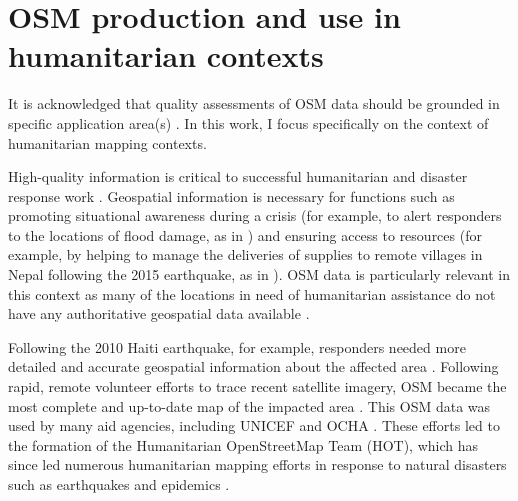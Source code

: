\section{OSM production and use in humanitarian contexts}

It is acknowledged that quality assessments of OSM data should be grounded in specific application area(s) \parencite{barron_comprehensive_2014}. In this work, I focus specifically on the context of humanitarian mapping contexts.

High-quality information is critical to successful humanitarian and disaster response work \parencite{cowan_geospatial_2011, poser_volunteered_2010, soden_infrastructure_2016, zook_volunteered_2010}. Geospatial information is necessary for functions such as promoting situational awareness during a crisis (for example, to alert responders to the locations of flood damage, as in \textcite{poser_volunteered_2010}) and ensuring access to resources (for example, by helping to manage the deliveries of supplies to remote villages in Nepal following the 2015 earthquake, as in \textcite{soden_infrastructure_2016}). OSM data is particularly relevant in this context as many of the locations in need of humanitarian assistance do not have any authoritative geospatial data available \parencite{zook_volunteered_2010}. 

Following the 2010 Haiti earthquake, for example, responders needed more detailed and accurate geospatial information about the affected area  \parencite{meier_crisis_2012, soden_infrastructure_2016, zook_volunteered_2010}. Following rapid, remote volunteer efforts to trace recent satellite imagery, OSM became the most complete and up-to-date map of the impacted area \parencite{soden_crowdsourced_2014}. This OSM data was used by many aid agencies, including UNICEF and OCHA \parencite{soden_crowdsourced_2014}. These efforts led to the formation of the Humanitarian OpenStreetMap Team (HOT), which has since led numerous humanitarian mapping efforts in response to natural disasters such as earthquakes and epidemics \parencite{dittus_mass_2017}. 


